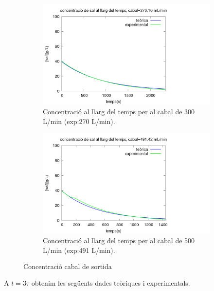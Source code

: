 \documentclass[10pt, twoside]{article}
\begin{document}
\begin{figure}[hbt!]
    \centering
    \begin{subfigure}{0.45\textwidth}
        \centering
        \includegraphics[width=\textwidth]{conc300.png}
        \caption{Concentració al llarg del temps per al cabal de 300 L/min (exp:270 L/min).}
        \label{fig:conc300}
    \end{subfigure}
    \hspace{0.025\textwidth}
    \begin{subfigure}{0.45\textwidth}
        \centering
        \includegraphics[width=\textwidth]{conc500.png}
        \caption{Concentració al llarg del temps per al cabal de 500 L/min (exp:491 L/min).}
        \label{fig:conc500}
    \end{subfigure}
    \caption{Concentració cabal de sortida}
    \label{fig:concs}
\end{figure}

A $t=3\tau$ obtenim les següents dades teòriques i experimentals.
\end{document}

